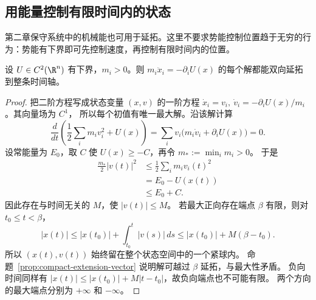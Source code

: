 \subsection*{用能量控制有限时间内的状态}
第二章保守系统中的机械能也可用于延拓。这里不要求势能控制位置趋于无穷的行为：势能有下界即可先控制速度，再控制有限时间内的位置。
\begin{theorem}[能量与全局延拓]\label{thm:energy-global-extension}
设 $U\in C^2(\R^n)$ 有下界，$m_i>0$。则
$m_i\ddot x_i=-\partial_iU(x)$ 的每个解都能双向延拓到整条时间轴。
\end{theorem}
\begin{proof}
把二阶方程写成状态变量 $(x,v)$ 的一阶方程
$\dot x_i=v_i,\ \dot v_i=-\partial_iU(x)/m_i$。其向量场为 $C^1$，
所以每个初值有唯一最大解。沿该解计算
\[
 \frac{d}{dt}\left(\frac12\sum_i m_iv_i^2+U(x)\right)
 =\sum_i v_i\bigl(m_i\dot v_i+\partial_iU(x)\bigr)=0.
\]
设常能量为 $E_0$，取 $C$ 使 $U(x)\geq-C$，再令 $m_*:=\min_i m_i>0$。
于是
\[
 \begin{aligned}
 \frac{m_*}{2}|v(t)|^2&\leq\frac12\sum_i m_iv_i(t)^2\\
 &=E_0-U(x(t))\\
 &\leq E_0+C.
\end{aligned}
\]
因此存在与时间无关的 $M$，使 $|v(t)|\leq M$。
若最大正向存在端点 $\beta$ 有限，则对 $t_0\leq t<\beta$，
\[
 |x(t)|\leq |x(t_0)|+\int_{t_0}^t|v(s)|\,ds
 \leq |x(t_0)|+M(\beta-t_0).
\]
所以 $(x(t),v(t))$ 始终留在整个状态空间中的一个紧球内。
命题~\ref{prop:compact-extension-vector} 说明解可越过 $\beta$ 延拓，与最大性矛盾。
负向时间同样有
$|x(t)|\leq|x(t_0)|+M|t-t_0|$，故负向端点也不可能有限。
两个方向的最大端点分别为 $+\infty$ 和 $-\infty$。
\end{proof}
